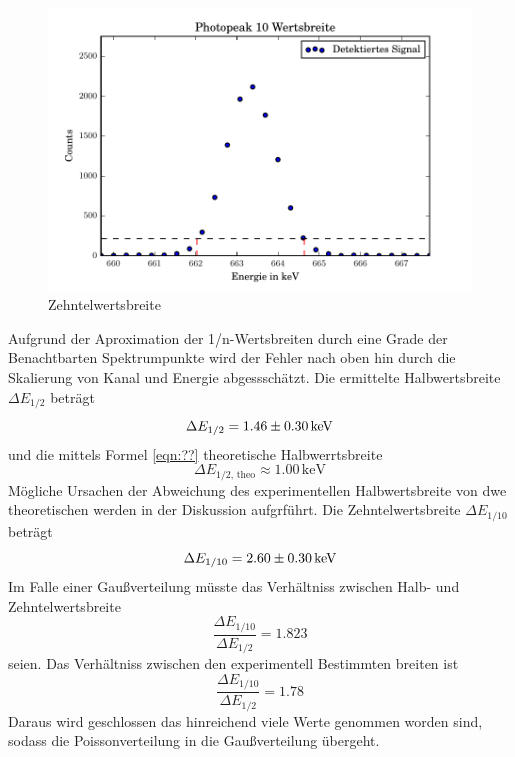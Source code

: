 \begin{figure}[h]
  \centering
  \includegraphics[width=\textwidth]{./build/10Wertsbreite.pdf}
  \caption{Zehntelwertsbreite}
  \label{fig:Zehntel}
\end{figure}
Aufgrund der Aproximation der 1/n-Wertsbreiten durch eine Grade der Benachtbarten Spektrumpunkte wird der Fehler nach oben hin durch die Skalierung von Kanal und Energie abgessschätzt. Die ermittelte Halbwertsbreite $\Delta E_{1/2}$ beträgt
\begin{equation}
  \Delta E_{1/2} = \num{1.46 +- 0.30} \, \text{keV}
\end{equation}
und die mittels Formel \ref{eqn:??} theoretische Halbwerrtsbreite
\begin{equation}
  \Delta E_{1/2 \text{, theo}} \approx 1.00 \, \text{keV}
  \label{eqn:HalbTheo}
\end{equation}
Mögliche Ursachen der Abweichung des experimentellen Halbwertsbreite von dwe theoretischen werden in der Diskussion aufgrführt. Die Zehntelwertsbreite $\Delta E_{1/10}$ beträgt
\begin{equation}
  \Delta E_{1/10} = \num{2.60 +- 0.30} \, \text{keV}
\end{equation}
Im Falle einer Gaußverteilung müsste das Verhältniss zwischen Halb- und Zehntelwertsbreite
\begin{equation}
  \frac{\Delta E_{1/10}}{\Delta E_{1/2}} = 1.823 
\end{equation}
seien. Das Verhältniss zwischen den experimentell Bestimmten breiten ist
\begin{equation}
  \frac{\Delta E_{1/10}}{\Delta E_{1/2}} = 1.78 
  \label{eqn:Ver}
\end{equation}
Daraus wird geschlossen das hinreichend viele Werte genommen worden sind, sodass die Poissonverteilung in die Gaußverteilung übergeht.

